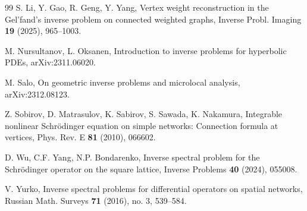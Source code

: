 \documentclass[11pt]{amsart}
\theoremstyle{definition}
\theoremstyle{plain}
\numberwithin{equation}{section}
\begin{document}
\begin{thebibliography}{99}
S. Li, Y. Gao, R. Geng, Y. Yang, Vertex weight reconstruction in the Gel’fand’s inverse problem on connected weighted graphs, Inverse Probl. Imaging {\bf 19} (2025), 965--1003.


M. Nursultanov, L. Oksanen, Introduction to inverse problems for hyperbolic PDEs, arXiv:2311.06020.




M. Salo, On geometric inverse problems and microlocal analysis, arXiv:2312.08123.


Z. Sobirov, D. Matrasulov, K. Sabirov, S. Sawada, K. Nakamura, Integrable nonlinear Schr{\"o}dinger equation on simple networks: Connection formula at vertices, Phys. Rev. E {\bf 81} (2010), 066602.

D. Wu, C.F. Yang, N.P. Bondarenko, Inverse spectral problem for the Schr{\"o}dinger operator on the square lattice, Inverse Problems {\bf 40} (2024), 055008.



 V. Yurko, {Inverse spectral problems for differential operators on spatial networks}, {Russian Math. Surveys} \textbf{71} (2016), no. 3, 539--584. 





 











\end{thebibliography}
\end{document}
